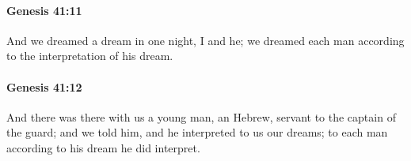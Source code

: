 		\paragraph{Genesis 41:11} %
			\label{GENESIS-41-11}

			And we dreamed a dream in one night, I and he; we dreamed each man according to the interpretation of his dream.


		\paragraph{Genesis 41:12} %
			\label{GENESIS-41-12}

			And there was there with us a young man, an Hebrew, servant to the captain of the guard; and we told him, and he interpreted to us our dreams; to each man according to his dream he did interpret.


